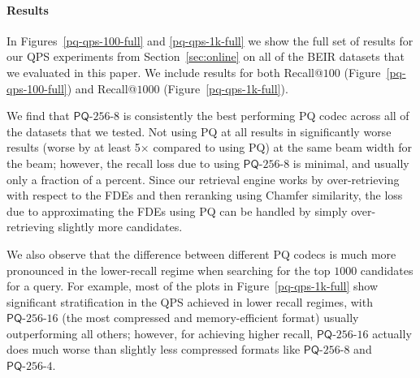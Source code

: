 \paragraph{Results} In Figures~\ref{pq-qps-100-full} and \ref{pq-qps-1k-full} we show the full set of results for our QPS experiments from Section~\ref{sec:online} on all of the BEIR datasets that we evaluated in this paper. We include results for both Recall@$100$ (Figure~\ref{pq-qps-100-full}) and Recall@$1000$ (Figure~\ref{pq-qps-1k-full}).

We find that $\mathsf{PQ}\text{-}256\text{-}8$ is consistently the best performing PQ codec across all of the datasets that we tested.
Not using PQ at all results in significantly worse results (worse by at least 5$\times$ compared to using PQ) at the same beam width for the beam; however, the recall loss due to using $\mathsf{PQ}\text{-}256\text{-}8$ is minimal, and usually only a fraction of a percent. 
Since our retrieval engine works by over-retrieving with respect to the FDEs and then reranking using Chamfer similarity, the loss due to approximating the FDEs using PQ can be handled by simply over-retrieving slightly more candidates.

We also observe that the difference between different PQ codecs is much more pronounced in the lower-recall regime when searching for the top $1000$ candidates for a query. For example, most of the plots in Figure~\ref{pq-qps-1k-full} show significant stratification in the QPS achieved in lower recall regimes, with  $\mathsf{PQ}\text{-}256\text{-}16$ (the most compressed and memory-efficient format) usually outperforming all others; however, for achieving higher recall, $\mathsf{PQ}\text{-}256\text{-}16$ actually does much worse than slightly less compressed formats like $\mathsf{PQ}\text{-}256\text{-}8$ and $\mathsf{PQ}\text{-}256\text{-}4$.



